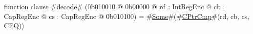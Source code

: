 function clause #\hyperref[zdecode]{decode}# (0b010010 @ 0b00000 @ rd : IntRegEnc @ cb : CapRegEnc @ cs : CapRegEnc @ 0b010100) = #\hyperref[zSome]{Some}#(#\hyperref[zCPtrCmp]{CPtrCmp}#(rd, cb, cs, CEQ))
